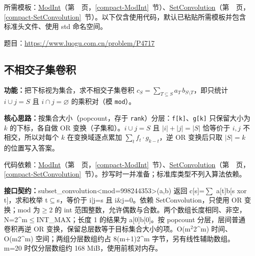 所需模板：\hyperref[compact-ModInt]{ModInt}（第~\pageref{compact-ModInt}~页，\ref{compact-ModInt}~节）、\hyperref[compact-SetConvolution]{SetConvolution}（第~\pageref{compact-SetConvolution}~页，\ref{compact-SetConvolution}~节）。以下仅含使用代码，默认已粘贴所需模板并包含标准头文件、使用 std 命名空间。

题目：\url{https://www.luogu.com.cn/problem/P4717}



\Needspace{607pt}

\subsection{不相交子集卷积}\label{compact-subset_convolution}

\noindent\textbf{功能：}\allowbreak 把下标视为集合，求不相交子集卷积 $c_S=\sum_{T\subseteq S}a_T\,b_{S\setminus T}$，即只统计 $i\cup j=S$ 且 $i\cap j=\varnothing$ 的乘积对（模 \texttt{mod}）。

\textbf{核心思路：}\allowbreak 按集合大小（popcount，存于 \texttt{rank}）分层：\texttt{f[k]}、\texttt{g[k]} 只保留大小为 $k$ 的下标，各自做 OR 变换（子集和）。$i\cup j=S$ 且 $|i|+|j|=|S|$ 恰等价于 $i,j$ 不相交，所以对每个 $k$ 在变换域逐点累加 $\sum_t f_t\cdot g_{k-t}$，逆 OR 变换后只取 $|S|=k$ 的位置写入答案。

代码依赖：\hyperref[compact-ModInt]{ModInt}（第~\pageref{compact-ModInt}~页，\ref{compact-ModInt}~节）、\hyperref[compact-SetConvolution]{SetConvolution}（第~\pageref{compact-SetConvolution}~页，\ref{compact-SetConvolution}~节）。抄写时一并准备；标准库类型不列入算法依赖。

{\sloppy{}\noindent\textbf{接口契约：}subset\_convolution<mod=998244353>(a,b) 返回 c[s]=$\sum$ a[t]b[s xor t]，求和枚举 t$\subseteq$s，等价于 i|j=s 且 i\&j=0。依赖 SetConvolution，只使用 OR 变换；mod 为$\ge$2 的 int 范围整数，允许偶数与合数。两个数组长度相同、非空，N=2\textasciicircum{}m$\le$INT\_MAX；长度 1 的结果为 a[0]b[0]。按 popcount 分层，层间普通卷积再逆 OR 变换，保留总层数等于目标集合大小的项。O(m$^{2}$2\textasciicircum{}m) 时间、O(m2\textasciicircum{}m) 空间；两组分层数组约占 8(m+1)2\textasciicircum{}m 字节，另有线性辅助数组。m=20 时仅分层数组约 168 MiB，使用前核对内存。\par}



\Needspace{410pt}

